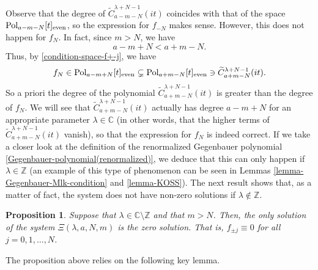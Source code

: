 \documentclass[12pt, pdflatex, a4paper]{article}
\theoremstyle{plain}
\newtheorem{prop}[thm]{Proposition}
\theoremstyle{definition}
\def\C{{\mathbb C}}
\def\Geg{\widetilde{C}}
\def\Pol{\text{\normalfont{Pol}}}
\def\Z{{\mathbb Z}}
\begin{document}
Observe that the degree of $\Geg_{a-m-N}^{\lambda+N-1}(it)$ coincides with that of the space $\Pol_{a-m-N}[t]_\text{{\normalfont{even}}}$, so the expression for $f_{-N}$ makes sense. However, this does not happen for $f_N$. In fact, since $m>N$, we have
\begin{equation*}
a-m+N < a+m-N.
\end{equation*}
Thus, by \eqref{condition-space-f+-j}, we have
\begin{equation*}
f_N \in \Pol_{a-m+N}[t]_\text{{\normalfont{even}}} \subsetneq \Pol_{a+m-N}[t]_\text{{\normalfont{even}}} \ni \Geg_{a+m-N}^{\lambda+N-1}(it).
\end{equation*}
So a priori the degree of the polynomial $\Geg_{a+m-N}^{\lambda+N-1}(it)$ is greater than the degree of $f_N$. We will see that $\Geg_{a+m-N}^{\lambda+N-1}(it)$ actually has degree $a-m+N$ for an appropriate parameter $\lambda \in \C$ (in other words, that the higher terms of $\Geg_{a+m-N}^{\lambda+N-1}(it)$ vanish), so that the expression for $f_N$ is indeed correct. If we take a closer look at the definition of the renormalized Gegenbauer polynomial \eqref{Gegenbauer-polynomial(renormalized)}, we deduce that this can only happen if $\lambda \in \Z$ (an example of this type of phenomenon can be seen in Lemmas \ref{lemma-Gegenbauer-Mlk-condition} and \ref{lemma-KOSS}). The next result shows that, as a matter of fact, the system does not have non-zero solutions if $\lambda \notin \Z$.

\begin{prop}\label{prop-condition-lambda} Suppose that $\lambda \in \C\setminus \Z$ and that $m > N$. Then, the only solution of the system $\Xi(\lambda, a, N, m)$ is the zero solution. That is, $f_{\pm j} \equiv 0$ for all $j = 0, 1, \ldots, N$.
\end{prop}

The proposition above relies on the following key lemma.
\end{document}
